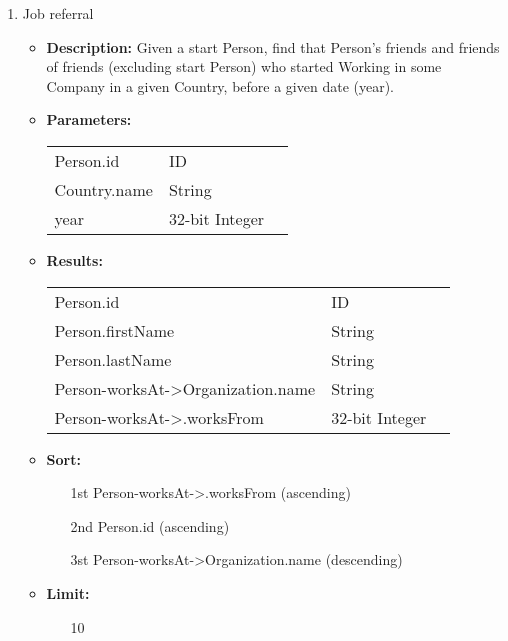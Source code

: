 {\begin{enumerate}
    \item Job referral
        \begin{itemize}
            \item \textbf{Description:}
                Given a start Person, find that Person's friends and friends of
                friends (excluding start Person) who started Working in some
                Company in a given Country, before a given date (year).    
            \item \textbf{Parameters:} \\
                \begin{tabular}{lll}
                    Person.id 	 				& ID & \parbox[t]{20cm}{\par \strut} \\
                    Country.name 	 			& String & \parbox[t]{20cm}{\par \strut} \\
                    year 		 				& 32-bit Integer & \parbox[t]{20cm}{\par \strut} \\
                \end{tabular}		
            \item \textbf{Results:} \\
                \begin{tabular}{lll}
                    Person.id 	 						& ID & \parbox[t]{20cm}{\par \strut} \\
                    Person.firstName 	 				& String & \parbox[t]{20cm}{\par \strut} \\
                    Person.lastName 	 				& String & \parbox[t]{20cm}{\par \strut} \\
                    Person-worksAt->Organization.name 	& String & \parbox[t]{20cm}{\par \strut} \\
                    Person-worksAt->.worksFrom 	 		& 32-bit Integer & \parbox[t]{20cm}{\par \strut} \\
                \end{tabular}		
            \item \textbf{Sort:}
                  \begin{itemize}
                    \item[1st] Person-worksAt->.worksFrom (ascending)
                    \item[2nd] Person.id (ascending)
                    \item[3st] Person-worksAt->Organization.name (descending)
                  \end{itemize}
            \item \textbf{Limit:}
                  \begin{itemize}
                    \item[] 10
                  \end{itemize}
        \end{itemize}


\end{enumerate}}
